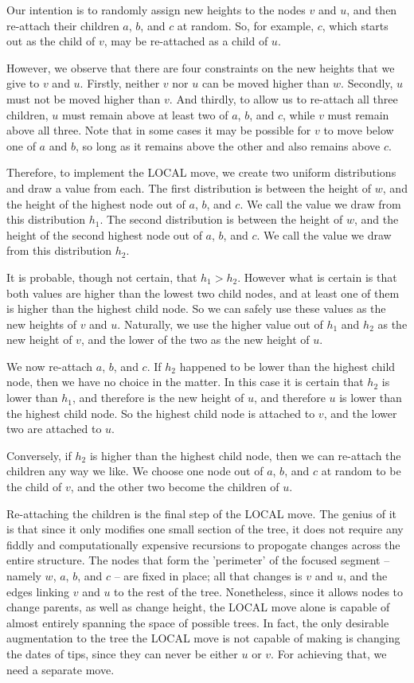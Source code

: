 \documentclass[10pt,journal,compsoc]{IEEEtran}
\begin{document}
Our intention is to randomly assign new heights to the nodes $v$ and $u$, and then re-attach their children $a$, $b$, and $c$ at random. So, for example, $c$, which starts out as the child of $v$, may be re-attached as a child of $u$.

However, we observe that there are four constraints on the new heights that we give to $v$ and $u$. Firstly, neither $v$ nor $u$ can be moved higher than $w$. Secondly, $u$ must not be moved higher than $v$. And thirdly, to allow us to re-attach all three children, $u$ must remain above at least two of $a$, $b$, and $c$, while $v$ must remain above all three. Note that in some cases it may be possible for $v$ to move below one of $a$ and $b$, so long as it remains above the other and also remains above $c$.

Therefore, to implement the LOCAL move, we create two uniform distributions and draw a value from each. The first distribution is between the height of $w$, and the height of the highest node out of $a$, $b$, and $c$. We call the value we draw from this distribution $h_1$. The second distribution is between the height of $w$, and the height of the second highest node out of $a$, $b$, and $c$. We call the value we draw from this distribution $h_2$.

It is probable, though not certain, that $h_1 > h_2$. However what is certain is that both values are higher than the lowest two child nodes, and at least one of them is higher than the highest child node. So we can safely use these values as the new heights of $v$ and $u$. Naturally, we use the higher value out of $h_1$ and $h_2$ as the new height of $v$, and the lower of the two as the new height of $u$.

We now re-attach $a$, $b$, and $c$. If $h_2$ happened to be lower than the highest child node, then we have no choice in the matter. In this case it is certain that $h_2$ is lower than $h_1$, and therefore is the new height of $u$, and therefore $u$ is lower than the highest child node. So the highest child node is attached to $v$, and the lower two are attached to $u$.

Conversely, if $h_2$ is higher than the highest child node, then we can re-attach the children any way we like. We choose one node out of $a$, $b$, and $c$ at random to be the child of $v$, and the other two become the children of $u$.

Re-attaching the children is the final step of the LOCAL move. The genius of it is that since it only modifies one small section of the tree, it does not require any fiddly and computationally expensive recursions to propogate changes across the entire structure. The nodes that form the 'perimeter' of the focused segment -- namely $w$, $a$, $b$, and $c$ -- are fixed in place; all that changes is $v$ and $u$, and the edges linking $v$ and $u$ to the rest of the tree. Nonetheless, since it allows nodes to change parents, as well as change height, the LOCAL move alone is capable of almost entirely spanning the space of possible trees. In fact, the only desirable augmentation to the tree the LOCAL move is not capable of making is changing the dates of tips, since they can never be either $u$ or $v$. For achieving that, we need a separate move.
\end{document}
